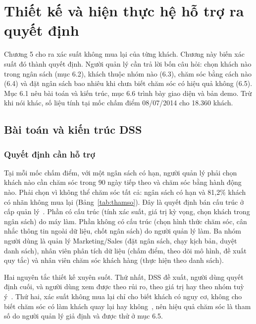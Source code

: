 \section{Thiết kế và hiện thực hệ hỗ trợ ra quyết định}

Chương 5 cho ra xác suất không mua lại của từng khách. Chương này biến xác suất đó thành quyết định. Người quản lý cần trả lời bốn câu hỏi: chọn khách nào trong ngân sách (mục 6.2), khách thuộc nhóm nào (6.3), chăm sóc bằng cách nào (6.4) và đặt ngân sách bao nhiêu khi chưa biết chăm sóc có hiệu quả không (6.5). Mục 6.1 nêu bài toán và kiến trúc, mục 6.6 trình bày giao diện và bản demo. Trừ khi nói khác, số liệu tính tại mốc chấm điểm 08/07/2014 cho 18.360 khách.

\subsection{Bài toán và kiến trúc DSS}
\subsubsection{Quyết định cần hỗ trợ}
Tại mỗi mốc chấm điểm, với một ngân sách có hạn, người quản lý phải chọn khách nào cần chăm sóc trong 90 ngày tiếp theo và chăm sóc bằng hành động nào. Phải chọn vì không thể chăm sóc tất cả: ngân sách có hạn và 81,2\% khách có nhãn không mua lại (Bảng~\ref{tab:thamso}). Đây là quyết định bán cấu trúc ở cấp quản lý~\cite{turban2011}. Phần có cấu trúc (tính xác suất, giá trị kỳ vọng, chọn khách trong ngân sách) do máy làm. Phần không có cấu trúc (chọn hình thức chăm sóc, cân nhắc thông tin ngoài dữ liệu, chốt ngân sách) do người quản lý làm. Ba nhóm người dùng là quản lý Marketing/Sales (đặt ngân sách, chạy kịch bản, duyệt danh sách), nhân viên phân tích dữ liệu (chấm điểm, theo dõi mô hình, đề xuất quy tắc) và nhân viên chăm sóc khách hàng (thực hiện theo danh sách).

Hai nguyên tắc thiết kế xuyên suốt. Thứ nhất, DSS đề xuất, người dùng quyết định cuối, và người dùng xem được theo rủi ro, theo giá trị hay theo nhóm tuỳ ý~\cite{turban2011}. Thứ hai, xác suất không mua lại chỉ cho biết khách có nguy cơ, không cho biết chăm sóc có làm khách quay lại hay không~\cite{lemmens2020}, nên hiệu quả chăm sóc là tham số do người quản lý giả định và được thử ở mục 6.5.


